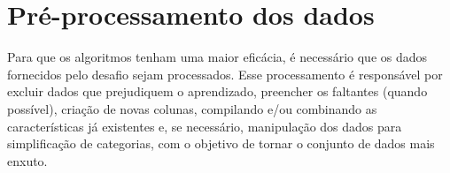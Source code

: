 \section{Pré-processamento dos dados}

Para que os algoritmos tenham uma maior eficácia, é necessário que os dados fornecidos pelo desafio sejam processados. Esse processamento é responsável por excluir dados que prejudiquem o aprendizado, preencher os faltantes (quando possível), criação de novas colunas, compilando e/ou combinando as características já existentes e, se necessário, manipulação dos dados para simplificação de categorias, com o objetivo de tornar o conjunto de dados mais enxuto.



\clearpage